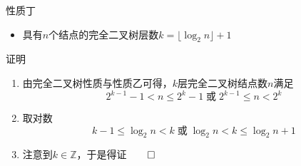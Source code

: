 \begin{frame}
    \frametitle{\insertsubsectionhead}
    \begin{block}{性质丁}
        \begin{itemize}
            \item 具有$n$个结点的完全二叉树层数$k=\lfloor\log_{2}{n}\rfloor+1$
        \end{itemize}
    \end{block}
    \pause
    \begin{exampleblock}{证明}
        \begin{enumerate}
            \item 由完全二叉树性质与性质乙可得，$k$层完全二叉树结点数$n$满足
                \[
                    2^{k-1}-1<n\leq2^{k}-1\;\text{或}\;2^{k-1}\leq{}n<2^{k}
                \]
            \item 取对数
                \[
                    k-1\leq\log_{2}{n}<k\;\text{或}\;\log_{2}{n}<k\leq\log_{2}{n}+1
                \]
            \item 注意到$k\in\mathbb{Z}$，于是得证\hfill$\qed$
        \end{enumerate}
    \end{exampleblock}
\end{frame}

